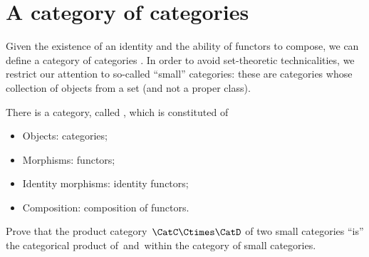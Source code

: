 \section{A category of categories}

Given the existence of an identity  and the ability of functors to compose, we can define a category of categories \Category.
In order to avoid set-theoretic technicalities, we restrict our attention to so-called ``small'' categories: these are categories whose collection of objects from a set (and not a proper class).

\begin{ctdefinition}
    \label{def:Category}
    There is a category, called \Category, which is constituted of
    \begin{itemize}
        \item Objects: categories;
        \item Morphisms: functors;
        \item Identity morphisms: identity functors;
        \item Composition: composition of functors.
    \end{itemize}
\end{ctdefinition}
\vfill
\begin{gradedexercise}
    Prove that the product category~$\CatC \Ctimes \CatD$ of two small categories ``is'' the categorical product of~\CatC and~\CatD within the category of small categories.
\end{gradedexercise}
